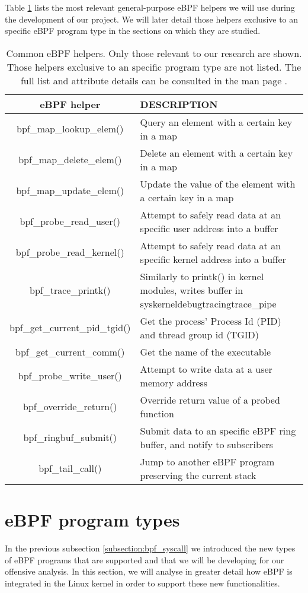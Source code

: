Table \ref{table:ebpf_helpers} lists the most relevant general-purpose eBPF helpers we will use during the development of our project. We will later detail those helpers exclusive to an specific eBPF program type in the sections on which they are studied.

\begin{table}[htbp]
\begin{tabular}{|c|>{\centering\arraybackslash}p{10cm}|}
\hline
eBPF helper & DESCRIPTION\\
\hline
\hline
bpf\_map\_lookup\_elem() & Query an element with a certain key in a map\\
\hline
bpf\_map\_delete\_elem() & Delete an element with a certain key in a map\\
\hline
bpf\_map\_update\_elem() & Update the value of the element with a certain key in a map\\
\hline
bpf\_probe\_read\_user() & Attempt to safely read data at an specific user address into a buffer\\
\hline
bpf\_probe\_read\_kernel() & Attempt to safely read data at an specific kernel address into a buffer\\
\hline
bpf\_trace\_printk() & Similarly to printk() in kernel modules, writes buffer in \/sys\/kernel\/debug\/tracing\/trace\_pipe\\
\hline
bpf\_get\_current\_pid\_tgid() & Get the process' Process Id (PID) and thread group id (TGID)\\
\hline
bpf\_get\_current\_comm() & Get the name of the executable\\
\hline
bpf\_probe\_write\_user() & Attempt to write data at a user memory address\\
\hline
bpf\_override\_return() & Override return value of a probed function\\
\hline
bpf\_ringbuf\_submit() & Submit data to an specific eBPF ring buffer, and notify to subscribers\\
\hline
bpf\_tail\_call() & Jump to another eBPF program preserving the current stack\\
\hline
\end{tabular}
\caption{Common eBPF helpers. Only those relevant to our research are shown. Those helpers exclusive to an specific program type are not listed. The full list and attribute details can be consulted in the man page \cite{ebpf_helpers}.}
\label{table:ebpf_helpers}
\end{table}


\section{eBPF program types} \label{section:ebpf_prog_types}
In the previous subsection \ref{subsection:bpf_syscall} we introduced the new types of eBPF programs that are supported and that we will be developing for our offensive analysis. In this section, we will analyse in greater detail how eBPF is integrated in the Linux kernel in order to support these new functionalities.

